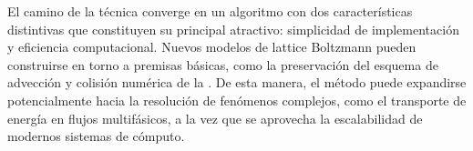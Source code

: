 El camino de la t\'ecnica converge en un algoritmo con dos caracter\'isticas distintivas que constituyen su principal atractivo: simplicidad de implementaci\'on y eficiencia computacional. Nuevos modelos de lattice Boltzmann pueden construirse en torno a premisas b\'asicas, como la preservaci\'on del esquema de advecci\'on y colisi\'on num\'erica de la \fdp{}. De esta manera, el m\'etodo puede expandirse potencialmente hacia la resoluci\'on de fen\'omenos complejos, como el transporte de energ\'ia en flujos multif\'asicos, a la vez que se aprovecha la escalabilidad de modernos sistemas de c\'omputo.